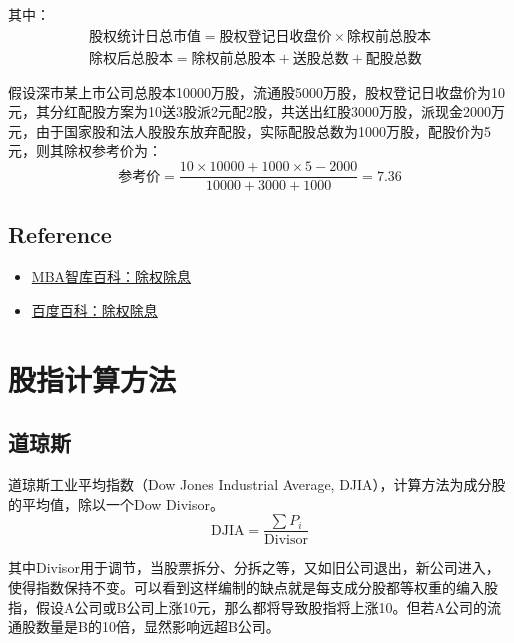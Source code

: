 \documentclass[11pt]{article}
\begin{document}
\begin{appendices}
其中：
\begin{gather*}
    \text{股权统计日总市值} = \text{股权登记日收盘价} \times \text{除权前总股本} \\
    \text{除权后总股本} = \text{除权前总股本} + \text{送股总数} + \text{配股总数}
\end{gather*}

\begin{example}
    假设深市某上市公司总股本10000万股，流通股5000万股，股权登记日收盘价为10元，其分红配股方案为10送3股派2元配2股，共送出红股3000万股，派现金2000万元，由于国家股和法人股股东放弃配股，实际配股总数为1000万股，配股价为5元，则其除权参考价为：
    \begin{equation*}
        \text{参考价} = \frac{10 \times 10000 + 1000 \times 5 - 2000}{ 10000 + 3000 + 1000} = 7.36
    \end{equation*}
\end{example}

\subsection*{Reference}

\begin{itemize}
    \item \href{https://wiki.mbalib.com/wiki/%E9%99%A4%E6%9D%83%E9%99%A4%E6%81%AF}{MBA智库百科：除权除息}
    \item \href{https://baike.baidu.com/item/%E9%99%A4%E6%9D%83%E9%99%A4%E6%81%AF/4315073}{百度百科：除权除息}
\end{itemize}

\section{股指计算方法}

\subsection{道琼斯}
    
道琼斯工业平均指数（Dow Jones Industrial Average, DJIA），计算方法为成分股的平均值，除以一个Dow Divisor。
\begin{equation*}
    \text{DJIA} = \frac{\sum P_i }{\text{Divisor}}
\end{equation*}

其中Divisor用于调节，当股票拆分、分拆之等，又如旧公司退出，新公司进入，使得指数保持不变。可以看到这样编制的缺点就是每支成分股都等权重的编入股指，假设A公司或B公司上涨10元，那么都将导致股指将上涨10。但若A公司的流通股数量是B的10倍，显然影响远超B公司。


\end{appendices}
\end{document}

